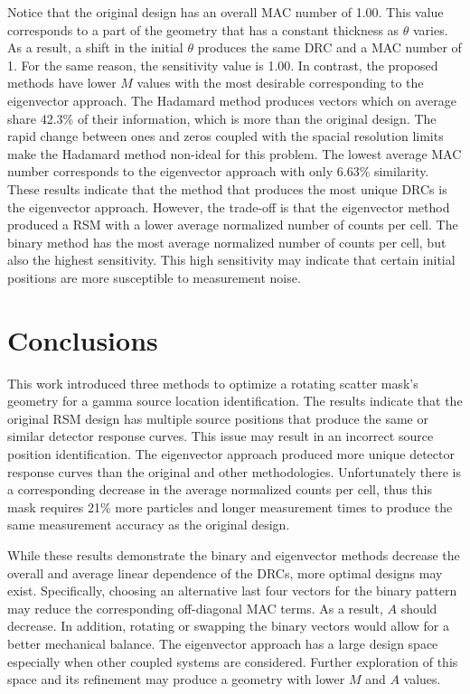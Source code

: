 \documentclass[3p,times]{elsarticle}
\begin{document}
Notice that the original design has an overall MAC number of 1.00.  This value corresponds to a part of the geometry that has a constant thickness as $\theta$ varies.  As a result, a shift in 
the initial $\theta$ produces the same DRC and a MAC number of 1.  For the same reason, the sensitivity value is 1.00.  In contrast, the proposed methods have lower $M$ values with 
the most desirable corresponding to the eigenvector approach.  The Hadamard method produces vectors which on average share 42.3\% of their information, which is more than the
original design.  The rapid change between ones and zeros coupled with the spacial resolution limits make the Hadamard method non-ideal for this problem.  
The lowest average MAC number corresponds to the eigenvector approach with only 6.63\% similarity.  These results indicate that the method that produces the most unique
DRCs is the eigenvector approach.  However, the trade-off is that the eigenvector method produced a RSM with a lower average normalized number
of counts per cell.  The binary method has the most average normalized number
of counts per cell, but also the highest sensitivity.  This high sensitivity may indicate that certain initial positions are more susceptible to measurement noise.

\section{Conclusions}
This work introduced three methods to optimize a rotating scatter mask's geometry for a gamma source location identification.  
The results indicate that the original RSM design has multiple source positions that produce the same or similar detector response curves.  
This issue may result in an incorrect source position identification.
The eigenvector approach produced more unique detector response curves than the original and other methodologies. 
Unfortunately there is a corresponding decrease in the average normalized counts per cell, thus this mask requires 21\% more particles and longer measurement times to produce the same measurement
accuracy as the original design.

While these results demonstrate the binary and eigenvector methods decrease the overall and average linear dependence of the DRCs, more optimal designs may exist.  Specifically,
choosing an alternative last four vectors for the binary pattern may reduce the corresponding off-diagonal MAC terms.  As a result, $A$ should decrease.  In addition, rotating or swapping the binary
vectors would allow for a better mechanical balance.  The eigenvector approach has a large
design space especially when other coupled systems are considered.  Further exploration of this space and its refinement may produce a geometry with lower $M$ and $A$ values.
\end{document}
